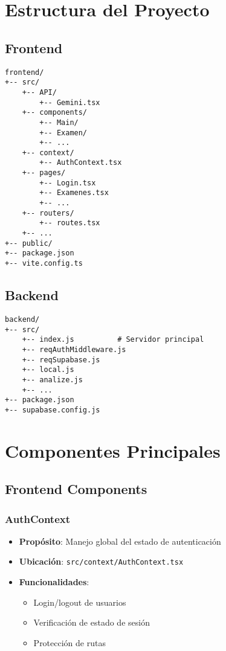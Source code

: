 \documentclass[12pt,a4paper]{report}
\begin{document}
\chapter{Estructura del Proyecto}

\section{Frontend}
\begin{lstlisting}
frontend/
+-- src/
    +-- API/
        +-- Gemini.tsx
    +-- components/
        +-- Main/
        +-- Examen/
        +-- ...
    +-- context/
        +-- AuthContext.tsx
    +-- pages/
        +-- Login.tsx
        +-- Examenes.tsx
        +-- ...
    +-- routers/
        +-- routes.tsx
    +-- ...
+-- public/
+-- package.json
+-- vite.config.ts
\end{lstlisting}

\section{Backend}
\begin{lstlisting}
backend/
+-- src/
    +-- index.js          # Servidor principal
    +-- reqAuthMiddleware.js
    +-- reqSupabase.js
    +-- local.js
    +-- analize.js
    +-- ...
+-- package.json
+-- supabase.config.js
\end{lstlisting}

\chapter{Componentes Principales}

\section{Frontend Components}

\subsection{AuthContext}
\begin{itemize}
    \item \textbf{Propósito}: Manejo global del estado de autenticación
    \item \textbf{Ubicación}: \texttt{src/context/AuthContext.tsx}
    \item \textbf{Funcionalidades}:
    \begin{itemize}
        \item Login/logout de usuarios
        \item Verificación de estado de sesión
        \item Protección de rutas
    \end{itemize}
\end{itemize}
\end{document}
